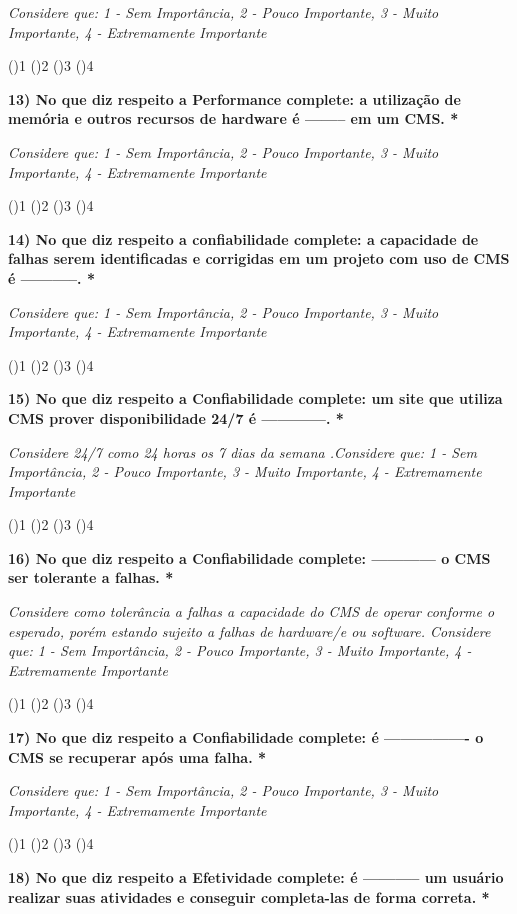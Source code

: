 \begin{apendicesenv}
\textit{Considere que: 1 - Sem Importância, 2 - Pouco Importante, 3 - Muito Importante, 4 - Extremamente Importante}

()1
()2
()3
()4




\textbf{13) No que diz respeito a Performance complete: a utilização de memória e outros recursos de hardware é -------- em um CMS. *}

\textit{Considere que: 1 - Sem Importância, 2 - Pouco Importante, 3 - Muito Importante, 4 - Extremamente Importante}

()1
()2
()3
()4




\textbf{14) No que diz respeito a confiabilidade complete: a capacidade de falhas serem identificadas e corrigidas em um projeto com uso de CMS é -----------. *}

\textit{Considere que: 1 - Sem Importância, 2 - Pouco Importante, 3 - Muito Importante, 4 - Extremamente Importante}

()1
()2
()3
()4




\textbf{15) No que diz respeito a Confiabilidade complete: um site que utiliza CMS prover disponibilidade 24/7 é ------------. *}

\textit{Considere 24/7 como 24 horas os 7 dias da semana .Considere que: 1 - Sem Importância, 2 - Pouco Importante, 3 - Muito Importante, 4 - Extremamente Importante}

()1
()2
()3
()4




\textbf{16) No que diz respeito a Confiabilidade complete: ------------ o CMS ser tolerante a falhas. *}

\textit{Considere como tolerância a falhas a capacidade do CMS de operar conforme o esperado, porém estando sujeito a falhas de hardware/e ou software. Considere que: 1 - Sem Importância, 2 - Pouco Importante, 3 - Muito Importante, 4 - Extremamente Importante}

()1
()2
()3
()4




\textbf{17) No que diz respeito a Confiabilidade complete: é ---------------- o CMS se recuperar após uma falha. *}

\textit{Considere que: 1 - Sem Importância, 2 - Pouco Importante, 3 - Muito Importante, 4 - Extremamente Importante}

()1
()2
()3
()4


\textbf{18) No que diz respeito a Efetividade complete: é ----------- um usuário realizar suas atividades e conseguir completa-las de forma correta. *}


\end{apendicesenv}

